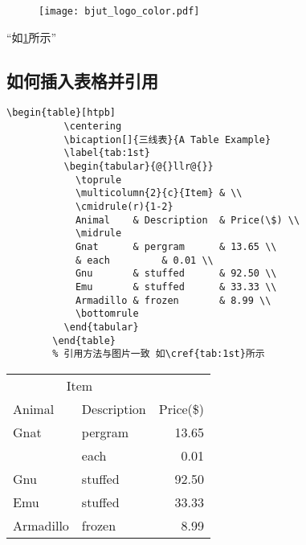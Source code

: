\begin{figure}[htpb]
  \centering
  \texttt{[image: bjut\_logo\_color.pdf]}
  \label{fig:logo}
\end{figure}
“如\cref{fig:logo}所示”

\subsection{如何插入表格并引用}

\begin{center}
  \begin{minipage}{0.95\textwidth}
    \small
    \begin{Verbatim}[frame=single]
        \begin{table}[htpb]
          \centering
          \bicaption[]{三线表}{A Table Example}
          \label{tab:1st}
          \begin{tabular}{@{}llr@{}}
            \toprule
            \multicolumn{2}{c}{Item} & \\
            \cmidrule(r){1-2}
            Animal    & Description  & Price(\$) \\
            \midrule
            Gnat      & pergram      & 13.65 \\
            & each         & 0.01 \\
            Gnu       & stuffed      & 92.50 \\
            Emu       & stuffed      & 33.33 \\
            Armadillo & frozen       & 8.99 \\
            \bottomrule
          \end{tabular}
        \end{table}
        % 引用方法与图片一致 如\cref{tab:1st}所示
    \end{Verbatim}
  \end{minipage}
\end{center}

        \begin{table}[htpb]
          \centering
          \label{tab:1st}
          \begin{tabular}{@{}llr@{}}
            \toprule
            \multicolumn{2}{c}{Item} & \\
            \cmidrule(r){1-2}
            Animal    & Description  & Price(\$) \\
            \midrule
            Gnat      & pergram      & 13.65 \\
            & each         & 0.01 \\
            Gnu       & stuffed      & 92.50 \\
            Emu       & stuffed      & 33.33 \\
            Armadillo & frozen       & 8.99 \\
            \bottomrule
          \end{tabular}
        \end{table}

